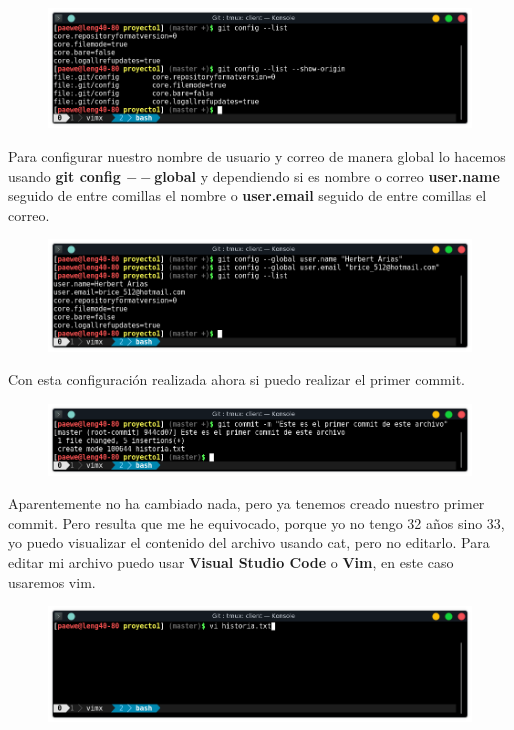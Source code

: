 \documentclass{article}
\begin{document}
\begin{figure}[h!]
  \centering
  \includegraphics[scale=0.75]{./Pictures/076_git_config.png}
\end{figure}

Para configurar nuestro nombre de usuario y correo de manera global lo hacemos
usando \textbf{git config $--$global} y dependiendo si es nombre o correo
\textbf{user.name} seguido de entre comillas el nombre o \textbf{user.email}
seguido de entre comillas el correo.

\begin{figure}[h!]
  \centering
  \includegraphics[scale=0.75]{./Pictures/077_git_config_global.png}
\end{figure}

\newpage

Con esta configuración realizada ahora si puedo realizar el primer commit.

\begin{figure}[h!]
  \centering
  \includegraphics[scale=0.75]{./Pictures/078_commit.png}
\end{figure}

Aparentemente no ha cambiado nada, pero ya tenemos creado nuestro primer
commit. Pero resulta que me he equivocado, porque yo no tengo 32 años sino 33,
yo puedo visualizar el contenido del archivo usando cat, pero no editarlo. Para
editar mi archivo puedo usar \textbf{Visual Studio Code} o \textbf{Vim}, en
este caso usaremos vim.

\begin{figure}[h!]
  \centering
  \includegraphics[scale=0.75]{./Pictures/079_vim_edit.png}
\end{figure}
\end{document}
